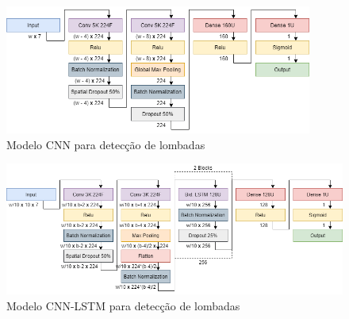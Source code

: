 \begin{figure}[h!]
  \centering
  \caption{Modelo CNN para detecção de lombadas}
  \label{fig:best_cnn_tipo_lombadas}
  \includegraphics[width=0.9\textwidth]{figuras/fig_42.png}
\end{figure}

\begin{figure}[h!]
  \centering
  \caption{Modelo CNN-LSTM para detecção de lombadas}
  \label{fig:best_cnn_lstm_tipo_lombadas}
  \includegraphics[width=1\textwidth]{figuras/fig_43.png}
\end{figure}

